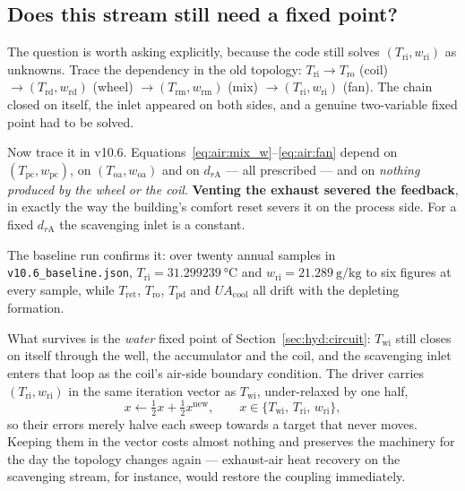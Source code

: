 \documentclass[11pt]{article}
\providecommand{\celsius}{\degreeCelsius}
\newcommand{\UA}{\ensuremath{U\!A}}
\begin{document}
\subsection{Does this stream still need a fixed point?}
\label{sec:air:fixedpoint}

The question is worth asking explicitly, because the code still solves
$(T_{\mathrm{ri}},w_{\mathrm{ri}})$ as unknowns. Trace the dependency in the
old topology:
$T_{\mathrm{ri}}\to T_{\mathrm{ro}}$ (coil)
$\to (T_{\mathrm{rd}},w_{\mathrm{rd}})$ (wheel)
$\to (T_{\mathrm{rm}},w_{\mathrm{rm}})$ (mix)
$\to (T_{\mathrm{ri}},w_{\mathrm{ri}})$ (fan). The chain closed on itself, the
inlet appeared on both sides, and a genuine two-variable fixed point had to be
solved.

Now trace it in v10.6. Equations~\eqref{eq:air:mix_w}--\eqref{eq:air:fan}
depend on $(T_{\mathrm{pc}},w_{\mathrm{pc}})$, on
$(T_{\mathrm{oa}},w_{\mathrm{oa}})$ and on $d_{r\mathrm{A}}$ --- all
prescribed --- and on \emph{nothing produced by the wheel or the coil}.
\textbf{Venting the exhaust severed the feedback}, in exactly the way the
building's comfort reset severs it on the process side. For a fixed
$d_{r\mathrm{A}}$ the scavenging inlet is a constant.

The baseline run confirms it: over twenty annual samples in
\texttt{v10.6\_baseline.json}, $T_{\mathrm{ri}}=\SI{31.299239}{\celsius}$ and
$w_{\mathrm{ri}}=\SI{21.289}{\gram\per\kilogram}$ to six figures at every
sample, while $T_{\mathrm{ret}}$, $T_{\mathrm{ro}}$, $T_{\mathrm{pd}}$ and
$\UA_{\mathrm{cool}}$ all drift with the depleting formation.

What survives is the \emph{water} fixed point of
Section~\ref{sec:hyd:circuit}: $T_{\mathrm{wi}}$ still closes on itself through
the well, the accumulator and the coil, and the scavenging inlet enters that
loop as the coil's air-side boundary condition. The driver carries
$(T_{\mathrm{ri}},w_{\mathrm{ri}})$ in the same iteration vector as
$T_{\mathrm{wi}}$, under-relaxed by one half,
\begin{equation}
x \leftarrow \tfrac12 x + \tfrac12 x^{\mathrm{new}},
\qquad
x \in \{T_{\mathrm{wi}},\,T_{\mathrm{ri}},\,w_{\mathrm{ri}}\},
\label{eq:air:relax}
\end{equation}
so their errors merely halve each sweep towards a target that never moves.
Keeping them in the vector costs almost nothing and preserves the machinery
for the day the topology changes again --- exhaust-air heat recovery on the
scavenging stream, for instance, would restore the coupling immediately.
\end{document}

